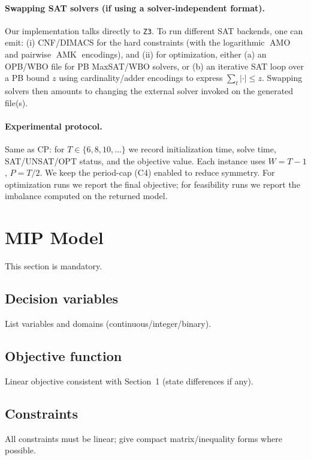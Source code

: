 \documentclass{article}
\begin{document}
\paragraph{Swapping SAT solvers (if using a solver-independent format).}
Our implementation talks directly to \texttt{Z3}. To run different SAT backends, one can emit:
(i) CNF/DIMACS for the hard constraints (with the logarithmic \(\operatorname{AMO}\) and pairwise \(\operatorname{AMK}\) encodings), and 
(ii) for optimization, either (a) an OPB/WBO file for PB MaxSAT/WBO solvers, or (b) an iterative SAT loop over a PB bound \(z\) using cardinality/adder encodings to express \(\sum_t | \cdot | \le z\).
Swapping solvers then amounts to changing the external solver invoked on the generated file(s).

\paragraph{Experimental protocol.}
Same as CP: for \(T\in\{6,8,10,\dots\}\) we record initialization time, solve time, SAT/UNSAT/OPT status, and the objective value. Each instance uses \(W=T-1\), \(P=T/2\). We keep the period-cap (C4) enabled to reduce symmetry. For optimization runs we report the final objective; for feasibility runs we report the imbalance computed on the returned model.



\section{MIP Model}
This section is mandatory.

\subsection{Decision variables}
List variables and domains (continuous/integer/binary).

\subsection{Objective function}
Linear objective consistent with Section~1 (state differences if any).

\subsection{Constraints}
All constraints must be linear; give compact matrix/inequality forms where possible.
\end{document}
